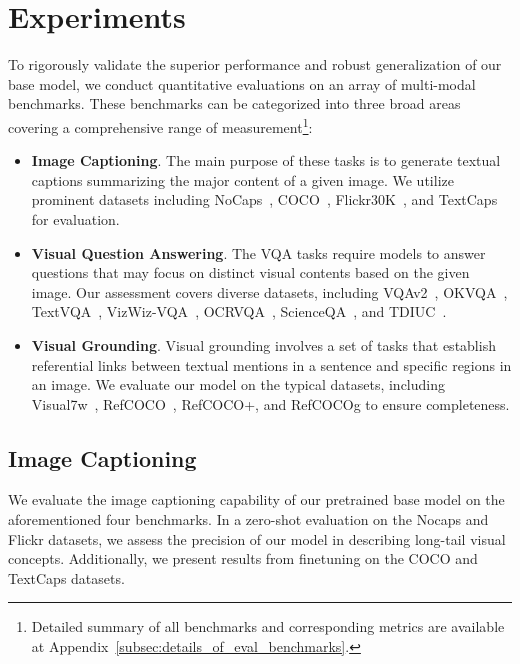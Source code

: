 \section{Experiments}


To rigorously validate the superior performance and robust generalization of our base model, we conduct quantitative evaluations on an array of multi-modal benchmarks. These benchmarks can be categorized into three broad areas covering a comprehensive range of measurement\footnote{Detailed summary of all benchmarks and corresponding metrics are available at Appendix~\ref{subsec:details_of_eval_benchmarks}.}:

\begin{itemize}
    \item \textbf{Image Captioning}. The main purpose of these tasks is to generate textual captions summarizing the major content of a given image. We utilize prominent datasets including NoCaps~\citep{agrawal2019nocaps}, COCO~\citep{lin2014microsoft}, Flickr30K~\citep{plummer2015flickr30k}, and TextCaps~\citep{sidorov2020textcaps} for evaluation.
    \item \textbf{Visual Question Answering}. The VQA tasks require models to answer questions that may focus on distinct visual contents based on the given image. Our assessment covers diverse datasets, including VQAv2~\citep{antol2015vqa}, OKVQA~\citep{marino2019ok}, TextVQA~\citep{singh2019towards}, VizWiz-VQA~\citep{gurari2018vizwiz}, OCRVQA~\citep{mishra2019ocr}, ScienceQA~\citep{lu2022learn}, and TDIUC~\citep{shrestha2019answer}.
    \item \textbf{Visual Grounding}. Visual grounding involves a set of tasks that establish referential links between textual mentions in a sentence and specific regions in an image. We evaluate our model on the typical datasets, including Visual7w~\citep{zhu2016visual7w}, RefCOCO~\citep{liu2017referring}, RefCOCO+, and RefCOCOg to ensure completeness.
\end{itemize}

\subsection{Image Captioning}




We evaluate the image captioning capability of our pretrained base model on the aforementioned four benchmarks. In a zero-shot evaluation on the Nocaps and Flickr datasets, we assess the precision of our model in describing long-tail visual concepts. Additionally, we present results from finetuning on the COCO and TextCaps datasets.


